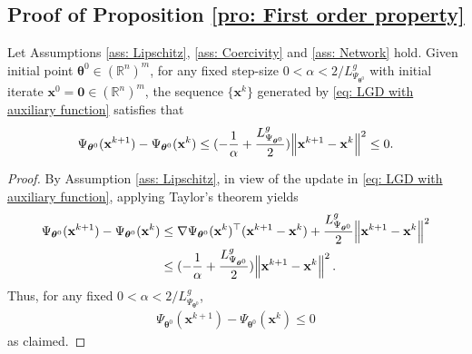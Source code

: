 \documentclass{siamart251216}
\begin{document}
\subsection{Proof of Proposition \ref{pro: First order property}}
\begin{lemma}
\label{lem: Sufficient descent}
    Let Assumptions \ref{ass: Lipschitz}, \ref{ass: Coercivity} and \ref{ass: Network} hold. Given initial point $\boldsymbol{\theta}^{0} \in (\mathbb{R}^{n})^{m}$, for any fixed step-size $0 < \alpha < 2/L_{\Psi_{\boldsymbol{\theta}^{0}}}^{g}$ with initial iterate $\mathbf{x}^{0} = \bm{0} \in (\mathbb{R}^{n})^{m}$, the sequence $\{\mathbf{x}^{k}\}$ generated by \eqref{eq: LGD with auxiliary function} satisfies that
    \begin{gather*}
        \Psi_{\boldsymbol{\theta}^{0}}(\mathbf{x}^{k+1}) - \Psi_{\boldsymbol{\theta}^{0}}(\mathbf{x}^{k}) \le (-\frac{1}{\alpha} + \frac{L_{\Psi_{\boldsymbol{\theta}^{0}}}^{g}}{2}) \norm{\mathbf{x}^{k+1} - \mathbf{x}^{k}}^{2} \le 0.
    \end{gather*}
\end{lemma}

\begin{proof}
    By Assumption \ref{ass: Lipschitz}, in view of the update in \eqref{eq: LGD with auxiliary function},  applying Taylor’s theorem yields
    \begin{align}
    \label{eq: Descent lemma}
        \begin{aligned}
            \Psi_{\boldsymbol{\theta}^{0}}(\mathbf{x}^{k+1}) - \Psi_{\boldsymbol{\theta}^{0}}(\mathbf{x}^{k}) & \le \nabla \Psi_{\boldsymbol{\theta}^{0}}(\mathbf{x}^{k})^{\top} (\mathbf{x}^{k+1} - \mathbf{x}^{k}) + \frac{L_{\Psi_{\boldsymbol{\theta}^{0}}}^{g}}{2} \norm{\mathbf{x}^{k+1} - \mathbf{x}^{k}}^{2}\\
            & \le (-\frac{1}{\alpha} + \frac{L_{\Psi_{\boldsymbol{\theta}^{0}}}^{g}}{2}) \norm{\mathbf{x}^{k+1} - \mathbf{x}^{k}}^{2}.
        \end{aligned}
    \end{align}
    Thus, for any fixed $0 < \alpha < 2/L_{\Psi_{\boldsymbol{\theta}^{0}}}^{g}$,
    \begin{gather*}
        \Psi_{\boldsymbol{\theta}^{0}}(\mathbf{x}^{k+1}) - \Psi_{\boldsymbol{\theta}^{0}}(\mathbf{x}^{k}) \le 0
    \end{gather*}
    as claimed.
\end{proof}
\end{document}

